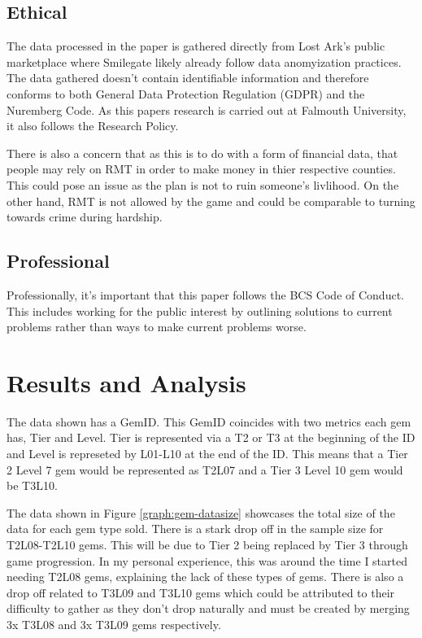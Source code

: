\documentclass[journal]{IEEEtran}
\begin{document}
\subsection{Ethical}
\noindent The data processed in the paper is gathered directly from Lost Ark's public marketplace where Smilegate likely already follow data anomyization practices\cite{Gruschka2018}. The data gathered doesn't contain identifiable information and therefore conforms to both General Data Protection Regulation (GDPR) and the Nuremberg Code\cite{Nuremberg1947}. As this papers research is carried out at Falmouth University, it also follows the Research Policy\cite{FalmouthEthicsPolicy2022}.

There is also a concern that as this is to do with a form of financial data, that people may rely on RMT in order to make money in thier respective counties. This could pose an issue as the plan is not to ruin someone's livlihood. On the other hand, RMT is not allowed by the game and could be comparable to turning towards crime during hardship.

\subsection{Professional}
\noindent Professionally, it's important that this paper follows the BCS Code of Conduct\cite{BCSCodeOfConduct2022}. This includes working for the public interest by outlining solutions to current problems rather than ways to make current problems worse.

\section{Results and Analysis}
\noindent The data shown has a GemID. This GemID coincides with two metrics each gem has, Tier and Level. Tier is represented via a T2 or T3 at the beginning of the ID and Level is represeted by L01-L10 at the end of the ID. This means that a Tier 2 Level 7 gem would be represented as T2L07 and a Tier 3 Level 10 gem would be T3L10. 

The data shown in Figure \ref{graph:gem-datasize} showcases the total size of the data for each gem type sold. There is a stark drop off in the sample size for T2L08-T2L10 gems. This will be due to Tier 2 being replaced by Tier 3 through game progression. In my personal experience, this was around the time I started needing T2L08 gems, explaining the lack of these types of gems. There is also a drop off related to T3L09 and T3L10 gems which could be attributed to their difficulty to gather as they don't drop naturally and must be created by merging 3x T3L08 and 3x T3L09 gems respectively.
\end{document}
